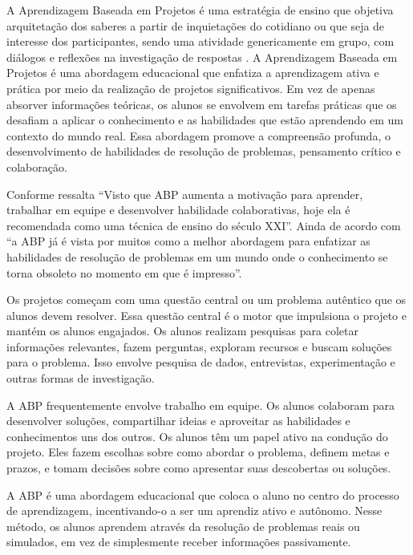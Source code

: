 A Aprendizagem Baseada em Projetos é uma estratégia de ensino que objetiva arquitetação dos saberes a partir de inquietações do cotidiano ou que seja de interesse dos participantes, sendo uma atividade genericamente em grupo, com diálogos e reflexões na investigação de respostas \cite{BENDER2015}. A Aprendizagem Baseada em Projetos é uma abordagem educacional que enfatiza a aprendizagem ativa e prática por meio da realização de projetos significativos. Em vez de apenas absorver informações teóricas, os alunos se envolvem em tarefas práticas que os desafiam a aplicar o conhecimento e as habilidades que estão aprendendo em um contexto do mundo real. Essa abordagem promove a compreensão profunda, o desenvolvimento de habilidades de resolução de problemas, pensamento crítico e colaboração.

Conforme  ressalta ``Visto que ABP aumenta a motivação para aprender, trabalhar em equipe e desenvolver habilidade colaborativas, hoje ela é recomendada como uma técnica de ensino do século XXI''. Ainda de acordo com  ``a ABP já é vista por muitos como a melhor abordagem para enfatizar as habilidades de resolução de problemas em um mundo onde o conhecimento se torna obsoleto no momento em que é impresso''.

Os projetos começam com uma questão central ou um problema autêntico que os alunos devem resolver. Essa questão central é o motor que impulsiona o projeto e mantém os alunos engajados. Os alunos realizam pesquisas para coletar informações relevantes, fazem perguntas, exploram recursos e buscam soluções para o problema. Isso envolve pesquisa de dados, entrevistas, experimentação e outras formas de investigação.

A ABP frequentemente envolve trabalho em equipe. Os alunos colaboram para desenvolver soluções, compartilhar ideias e aproveitar as habilidades e conhecimentos uns dos outros. Os alunos têm um papel ativo na condução do projeto. Eles fazem escolhas sobre como abordar o problema, definem metas e prazos, e tomam decisões sobre como apresentar suas descobertas ou soluções.


A ABP é uma abordagem educacional que coloca o aluno no centro do processo de aprendizagem, incentivando-o a ser um aprendiz ativo e autônomo. Nesse método, os alunos aprendem através da resolução de problemas reais ou simulados, em vez de simplesmente receber informações passivamente.

